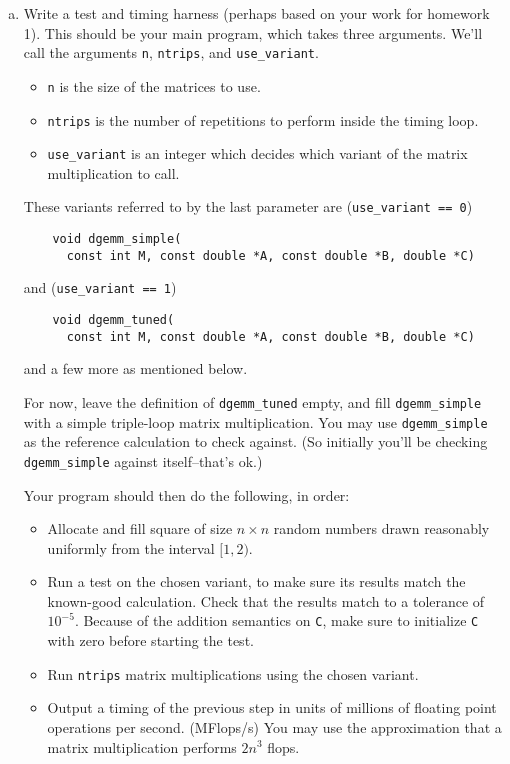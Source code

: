 \documentclass[11pt]{article}
\begin{document}
\begin{enumerate}[a)]
  \item Write a test and timing harness (perhaps based on your work
    for homework 1).
    This should be your main program, which takes three arguments.
    We'll call the arguments \texttt{n}, \texttt{ntrips}, and
    \texttt{use\_variant}.
    \begin{itemize}
      \item \texttt{n} is the size of the matrices to use.
      \item \texttt{ntrips} is the number of repetitions to perform inside
        the timing loop.
      \item \texttt{use\_variant} is an integer which decides which
        variant of the matrix multiplication to call.
    \end{itemize}
    These variants referred to by the last parameter are (\texttt{use\_variant == 0})
    \begin{lstlisting}
    void dgemm_simple(
      const int M, const double *A, const double *B, double *C)
    \end{lstlisting}
    and (\texttt{use\_variant == 1})
    \begin{lstlisting}
    void dgemm_tuned(
      const int M, const double *A, const double *B, double *C)
    \end{lstlisting}
    and a few more as mentioned below.

    For now, leave the definition of \texttt{dgemm\_tuned} empty, and
    fill \texttt{dgemm\_simple} with a simple triple-loop matrix
    multiplication. You may use \texttt{dgemm\_simple} as the
    reference calculation to check against. (So initially you'll be
    checking \texttt{dgemm\_simple} against itself--that's ok.)

    Your program should then do the following, in order:
    \begin{itemize}
      \item Allocate and fill square of size $n\times n$ random 
        numbers drawn reasonably uniformly from the interval  $[1,2)$.
      \item Run a test on the chosen variant, to make sure its results
        match the known-good calculation. Check that the results match
        to a tolerance of $10^{-5}$. Because of the addition semantics
        on \texttt{C}, make sure to initialize \texttt{C} with zero
        before starting the test.
      \item Run \texttt{ntrips} matrix multiplications using the
        chosen variant.
      \item Output a timing of the previous step in units of
        millions of floating point operations per second. (MFlops/s)
        You may use the approximation that a matrix multiplication
        performs $2n^3$ flops.
    \end{itemize}


\end{enumerate}
\end{document}

